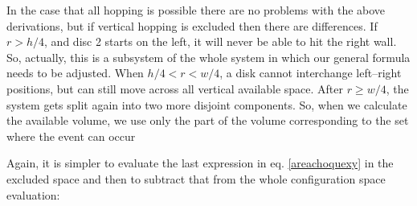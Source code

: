 \documentclass[superscriptaddress,pre,reprint,showpacs,twocolumn]{revtex4-1}
\begin{document}
    
    In the case that all hopping is possible there are no problems with the above derivations,
    but if vertical hopping is excluded then there are differences.
 If $r>h/4$, and disc 2 starts
    on the left, it will never be able to hit the right wall. So, actually, this
    is a subsystem of the whole  system in which our general formula needs
    to be adjusted. 
    When $h/4<r<w/4$, a disk cannot interchange left--right positions,
    but can still move across all vertical available space.  After $r\geq w/4$,
    the system gets split again into two more disjoint components.
    So, when we calculate the available volume, we use only the
    part of the volume corresponding to the set where the event can occur
    
    Again, it is simpler to evaluate the last expression in eq. \ref{areachoquexy}
    in the excluded space and then to subtract that from the whole configuration
    space evaluation:
\end{document}
